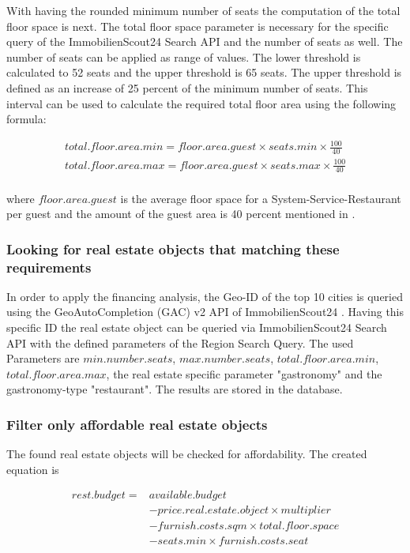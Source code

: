 With having the rounded minimum number of seats the computation of the total floor space is next. The total
 floor space parameter is necessary for the specific query of the ImmobilienScout24 Search API \cite{ImmoScout} and
 the number of seats as well. The number of seats can be applied as range of values. The lower threshold is calculated to 52 seats and
 the upper threshold is 65 seats. The upper threshold is defined as an increase of 25 percent of the minimum number of seats.
 This interval can be used to calculate the required total floor area using the following formula:

\begin{equation}
    \begin{aligned}
        total.floor.area.min = floor.area.guest \times seats.min \times \frac{100}{40} \\
        total.floor.area.max = floor.area.guest \times seats.max \times \frac{100}{40} \\
    \end{aligned}
    \label{eq:total_floor_space}
\end{equation}

where $floor.area.guest$ is the average floor space for a System-Service-Restaurant per guest \cite{FlaecheGast} and the
 amount of the guest area is 40 percent mentioned in \cite{FlaecheGastronomie}.

\subsubsection{Looking for real estate objects that matching these requirements}
In order to apply the financing analysis, the Geo-ID of the top 10 cities is queried using the GeoAutoCompletion (GAC)
 v2 \ac{API} of ImmobilienScout24 \cite{ImmoScout}. Having this specific ID the real estate object can be queried via ImmobilienScout24 Search \ac{API}
 with the defined parameters of the Region Search Query. The used Parameters are $min.number.seats$,
 $max.number.seats$, $total.floor.area.min$, $total.floor.area.max$, the real estate specific parameter
 "gastronomy" and the gastronomy-type "restaurant". The results are stored in the \pg{} database.

\subsubsection{Filter only affordable real estate objects}
The found real estate objects will be checked for affordability. The created equation is
\begin{center}
    \begin{equation}
        \begin{aligned}
        rest.budget = & available.budget \\
            &- price.real.estate.object \times multiplier \\
            &- furnish.costs.sqm \times total.floor.space \\
            &- seats.min \times furnish.costs.seat
        \end{aligned}
        \label{eq:affordable}
    \end{equation}
\end{center}

